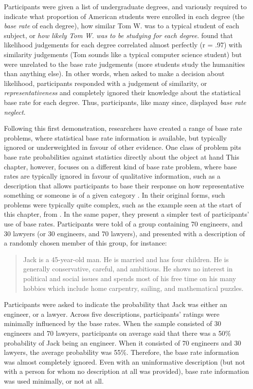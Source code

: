 Participants were given a list of undergraduate degrees,
and variously required to indicate what proportion of American students
were enrolled in each degree (the \emph{base rate} of each degree),
how similar Tom W. was to a typical student of each subject,
or \emph{how likely Tom W. was to be studying for each degree}.
\citet{Kahneman1973} found that likelihood judgements for each degree
correlated almost perfectly (r = .97) with similarity judgements
(Tom sounds like a typical computer science student)
but were unrelated to the base rate judgements
(more students study the humanities than anything else).
In other words, when asked to make a decision about likelihood,
participants responded with a judgement of similarity, or \emph{representativeness}
and completely ignored their knowledge about the
statistical base rate for each degree.
Thus,  participants, like many since,
displayed \emph{base rate neglect}.

Following this first demonstration, researchers have created
a range of base rate problems, where statistical base rate information is available,
but typically ignored or underweighted in favour of other evidence.
One class of problem pits base rate probabilities
against statistics directly about the object at hand
This chapter, however, focuses on a different kind of base rate problem,
where base rates are typically ignored in favour of qualitative information,
such as a description that allows participants to
base their response on how representative something or someone is
of a given category \citep{Kahneman2002,Tversky1974,Kahneman1973}.
In their original forms, such problems were typically quite complex,
such as the example seen at the start of this chapter,
from \citet{Kahneman1973}.
In the same paper, they present a simpler test of
participants' use of base rates.
Participants were told of a group containing
70 engineers, and 30 lawyers (or 30 engineers, and 70 lawyers),
and presented with a description of a randomly chosen
member of this group, for instance:

\begin{quote}
  Jack is a 45-year-old man. He is married and has four children. He
  is generally conservative, careful, and ambitious. He shows no
  interest in political and social issues and spends most of his free
  time on his many hobbies which include home carpentry, sailing, and
  mathematical puzzles.
\end{quote}

Participants were asked to indicate the probability that
Jack was either an engineer, or a lawyer.
Across five descriptions, participants' ratings were
minimally influenced by the base rates.
When the sample consisted of 30 engineers and 70 lawyers,
participants on average said that there was a 50\% probability
of Jack being an engineer.
When it consisted of 70 engineers and 30 lawyers,
the average probability was 55\%.
Therefore, the base rate information was almost completely ignored.
Even with an uninformative description (but not with a person
for whom no description at all was provided),
base rate information was used minimally, or not at all.

